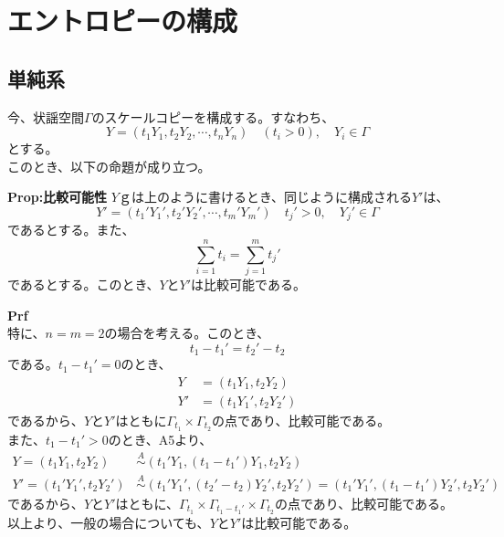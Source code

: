 \documentclass[a4paper,11pt]{jsarticle}
\begin{document}
\section{エントロピーの構成}
\subsection{単純系}
今、状謡空間$\Gamma$のスケールコピーを構成する。すなわち、
\begin{equation}
    Y =(t_1 Y_1,t_2 Y_2,\cdots,t_n Y_n) \quad (t_i>0), \quad Y_i \in \Gamma
\end{equation}
とする。\\
このとき、以下の命題が成り立つ。
\begin{itembox}[l]{\textbf{Prop:比較可能性}}
    $Y$ｇは上のように書けるとき、同じように構成される$Y'$は、
    \begin{equation}
        Y' =(t_1' Y_1',t_2' Y_2',\cdots,t_m' Y_m') \quad t_j'>0, \quad Y_j' \in \Gamma
    \end{equation}
    であるとする。また、
    \begin{equation}
        \sum_{i=1}^n t_i = \sum_{j=1}^m t_j'
    \end{equation}
    であるとする。このとき、$Y$と$Y'$は比較可能である。
\end{itembox}
\textbf{Prf}\\
特に、$n=m=2$の場合を考える。このとき、
\begin{equation}
    t_1-t_1' = t_2'-t_2
\end{equation}
である。$t_1-t_1' =0$のとき、
\begin{align}
    Y &= (t_1 Y_1,t_2 Y_2)\\
    Y' &= (t_1 Y_1',t_2 Y_2')
\end{align}
であるから、$Y$と$Y'$はともに$\Gamma _{t_1} \times \Gamma _{t_2}$の点であり、比較可能である。\\
また、$t_1-t_1' >0$のとき、A5より、
\begin{align}
    Y=(t_1 Y_1,t_2 Y_2) &\overset{A}{\sim} (t_1' Y_1,(t_1-t_1')Y_1,t_2 Y_2)\\
    Y'=(t_1' Y_1',t_2 Y_2') &\overset{A}{\sim} (t_1' Y_1',(t_2'-t_2)Y_2',t_2 Y_2')=(t_1' Y_1',(t_1-t_1')Y_2',t_2 Y_2')
\end{align}
であるから、$Y$と$Y'$はともに、$\Gamma _{t_1} \times \Gamma _{t_1-t_1'} \times \Gamma _{t_2}$の点であり、比較可能である。\\
以上より、一般の場合についても、$Y$と$Y'$は比較可能である。\hfill\qedsymbol\\
\end{document}
